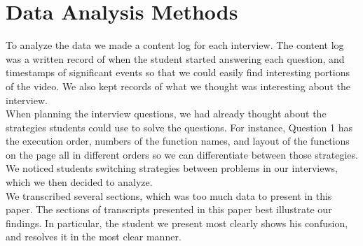 \documentclass{article}
\begin{document}
\newpage
\section{Data Analysis Methods}

To analyze the data we made a content log for each interview.
The content log was a written record of when the student started answering each question,
 and timestamps of significant events so that we could easily find interesting portions of the video.
We also kept records of what we thought was interesting about the interview. \\

When planning the interview questions, we had already thought about the strategies students could use to solve the questions.
For instance, Question 1 has the execution order, numbers of the function names,
 and layout of the functions on the page all in different orders so we can differentiate between those strategies.
We noticed students switching strategies between problems in our interviews, which we then decided to analyze. \\

We transcribed several sections, which was too much data to present in this paper.
The sections of transcripts presented in this paper best illustrate our findings.
In particular, the student we present most clearly shows his confusion, and resolves it in the most clear manner.
\end{document}
